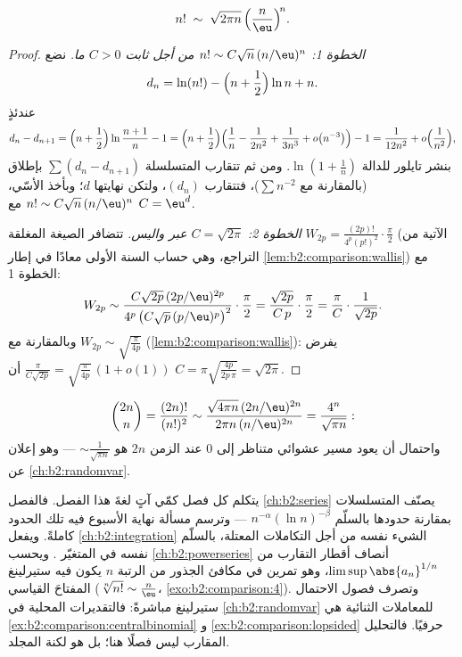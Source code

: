 \begin{theorem}[ستيرلينغ]\label{thm:b2:comparison:stirling}
\[
n! \;\sim\; \sqrt{2\pi n}\, \Bigl(\frac{n}{\eu}\Bigr)^{\!n}
.\index{صيغة ستيرلنغ}
\]
\end{theorem}

\begin{proof}
\emph{الخطوة 1: $n! \sim C \sqrt n\, (n/\eu)^n$ من أجل ثابت $C >
0$ ما.} نضع
\[
d_n = \ln(n!) - \Bigl(n + \frac12\Bigr)\ln n + n .
\]
عندئذٍ
\[
d_n - d_{n+1}
= \Bigl(n + \frac12\Bigr) \ln\frac{n+1}{n} - 1
= \Bigl(n + \frac12\Bigr)\Bigl(\frac1n - \frac{1}{2n^2} +
\frac{1}{3n^3} + o\bigl(n^{-3}\bigr)\Bigr) - 1
= \frac{1}{12n^2} + o\Bigl(\frac{1}{n^2}\Bigr),
\]
بنشر تايلور للدالة $\ln(1 + \frac1n)$. ومن ثم تتقارب المتسلسلة $\sum (d_n
- d_{n+1})$ بإطلاق (بالمقارنة مع $\sum
n^{-2}$)، فتتقارب $(d_n)$، ولتكن نهايتها $d$؛ وبأخذ الأسّي، $n! \sim
C\sqrt n\,(n/\eu)^n$ مع $C = \eu^{d}$.

\emph{الخطوة 2: $C = \sqrt{2\pi}$ عبر واليس.} تتضافر الصيغة المغلقة $W_{2p}
= \frac{(2p)!}{4^p (p!)^2}\cdot\frac\pi2$ (الآتية من التراجع،
وهي حساب السنة الأولى معادًا في إطار
\cref{lem:b2:comparison:wallis}) مع الخطوة 1:
\[
W_{2p} \sim \frac{C\sqrt{2p}\,(2p/\eu)^{2p}}
{4^p\,\bigl(C\sqrt p\,(p/\eu)^p\bigr)^2}\cdot\frac{\pi}{2}
= \frac{\sqrt{2p}}{C\,p}\cdot\frac{\pi}{2}
= \frac{\pi}{C}\cdot\frac{1}{\sqrt{2p}} .
\]
وبالمقارنة مع $W_{2p} \sim \sqrt{\frac{\pi}{4p}}$
(\cref{lem:b2:comparison:wallis}): يفرض $\frac{\pi}{C\sqrt{2p}} =
\sqrt{\frac{\pi}{4p}}\,(1 + o(1))$ أن $C = \pi
\sqrt{\frac{4p}{2p\,\pi}} = \sqrt{2\pi}$.
\end{proof}

\begin{example}\label{ex:b2:comparison:centralbinomial}
\[
\binom{2n}{n} = \frac{(2n)!}{(n!)^2}
\sim \frac{\sqrt{4\pi n}\,(2n/\eu)^{2n}}{2\pi n\,(n/\eu)^{2n}}
= \frac{4^n}{\sqrt{\pi n}} :
\]
واحتمال أن يعود مسير عشوائي متناظر إلى $0$ عند الزمن
$2n$ هو $\sim \frac{1}{\sqrt{\pi n}}$ --- وهو إعلان عن
\cref{ch:b2:randomvar}.
\end{example}

\begin{remark}\label{rem:b2:comparison:perspectives}
يتكلم كل فصل كمّي آتٍ لغةَ هذا الفصل.
فالفصل \cref{ch:b2:series} يصنّف المتسلسلات بمقارنة
حدودها بالسلّم $n^{-\alpha}(\ln n)^{-\beta}$ --- وترسم
مسألة نهاية الأسبوع فيه تلك الحدود كاملةً.
ويفعل \cref{ch:b2:integration} الشيء نفسه من أجل التكاملات المعتلة،
بالسلّم نفسه في المتغيّر .
ويحسب \cref{ch:b2:powerseries} أنصاف أقطار التقارب من
$\limsup\abs{a_n}^{1/n}$، وهو تمرين في مكافئ الجذور من الرتبة $n$
يكون فيه ستيرلينغ المفتاحَ القياسي ($\sqrt[n]{n!}
\sim \frac n\eu$، \cref{exo:b2:comparison:4}). وتصرف فصول
الاحتمال ستيرلينغ مباشرةً: فالتقديرات المحلية
في \cref{ch:b2:randomvar} للمعاملات الثنائية
هي \cref{ex:b2:comparison:centralbinomial} و
\cref{ex:b2:comparison:lopsided} حرفيًا. فالتحليل المقارب ليس
فصلًا هنا؛ بل هو لكنة المجلد.
\end{remark}

